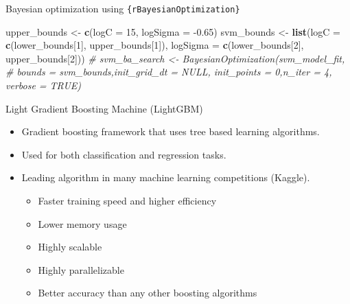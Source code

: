 \documentclass[12pt,ignorenonframetext,]{beamer}
\newenvironment{Shaded}{\begin{snugshade}}{\end{snugshade}}
\newcommand{\CommentTok}[1]{\textcolor[rgb]{0.56,0.35,0.01}{\textit{#1}}}
\newcommand{\DataTypeTok}[1]{\textcolor[rgb]{0.13,0.29,0.53}{#1}}
\newcommand{\DecValTok}[1]{\textcolor[rgb]{0.00,0.00,0.81}{#1}}
\newcommand{\FloatTok}[1]{\textcolor[rgb]{0.00,0.00,0.81}{#1}}
\newcommand{\KeywordTok}[1]{\textcolor[rgb]{0.13,0.29,0.53}{\textbf{#1}}}
\newcommand{\NormalTok}[1]{#1}
\newcommand{\StringTok}[1]{\textcolor[rgb]{0.31,0.60,0.02}{#1}}
\providecommand{\tightlist}{%
  \setlength{\itemsep}{0pt}\setlength{\parskip}{0pt}}
\begin{document}
\begin{frame}[fragile]{Bayesian optimization using
\texttt{\{rBayesianOptimization\}}}
\begin{Shaded}
\begin{Highlighting}[]
\NormalTok{upper_bounds <-}\StringTok{ }\KeywordTok{c}\NormalTok{(}\DataTypeTok{logC =} \DecValTok{15}\NormalTok{, }\DataTypeTok{logSigma =} \FloatTok{-0.65}\NormalTok{)}
\NormalTok{svm_bounds <-}\StringTok{ }\KeywordTok{list}\NormalTok{(}\DataTypeTok{logC =} \KeywordTok{c}\NormalTok{(lower_bounds[}\DecValTok{1}\NormalTok{], upper_bounds[}\DecValTok{1}\NormalTok{]), }\DataTypeTok{logSigma =} \KeywordTok{c}\NormalTok{(lower_bounds[}\DecValTok{2}\NormalTok{], upper_bounds[}\DecValTok{2}\NormalTok{]))}
\CommentTok{# svm_ba_search <- BayesianOptimization(svm_model_fit,}
\CommentTok{#    bounds = svm_bounds,init_grid_dt = NULL, init_points = 0,n_iter = 4, verbose = TRUE)}
\end{Highlighting}
\end{Shaded}

\normalsize

\end{frame}

\begin{frame}{Light Gradient Boosting Machine (LightGBM)}
\protect\hypertarget{light-gradient-boosting-machine-lightgbm}{}

\begin{itemize}
\tightlist
\item
  Gradient boosting framework that uses tree based learning algorithms.
  \vspace{2mm}
\item
  Used for both classification and regression tasks. \vspace{2mm}
\item
  Leading algorithm in many machine learning competitions (Kaggle).
  \vspace{2mm}

  \begin{itemize}
      \item Faster training speed and higher efficiency
      \item Lower memory usage
      \item Highly scalable
      \item Highly parallelizable
      \item Better accuracy than any other boosting algorithms
  \end{itemize}
\end{itemize}

\end{frame}
\end{document}
